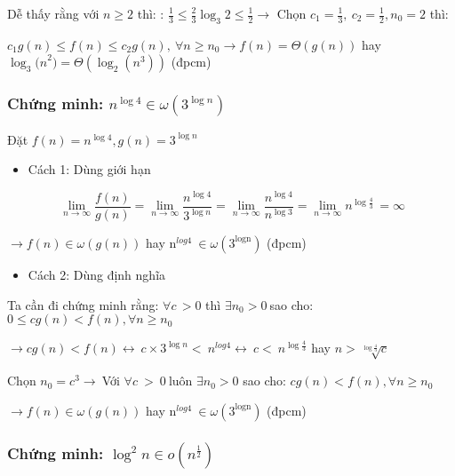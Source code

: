 Dễ thấy rằng với \(n \geq 2\) thì: :
\(\frac{1}{3} \leq \frac{2}{3}\log_{3}2 \leq \frac{1}{2} \rightarrow\)
Chọn \(c_{1} = \frac{1}{3},\ c_{2} = \frac{1}{2},n_{0} = 2\) thì:

\(c_{1}g(n) \leq f(n) \leq c_{2}g(n),\ \forall n \geq n_{0} \rightarrow f(n) = \Theta(g(n))\)
hay \(\log_{3}{{(n}^{2})} = \Theta(\log_{2}{(n^{3})})\) (đpcm)

\subsubsection{  \textbf{Chứng minh:}
  \(n^{\log 4} \in \omega\left(3^{\log n}\right)\)}

Đặt \(f(n) = n^{\log 4},g(n) = 3^{\log n}\)

\begin{itemize}
\item
  Cách 1: Dùng giới hạn
\end{itemize}

\[\ \lim_{n \rightarrow \infty}\frac{f(n)}{g(n)} = \lim_{n \rightarrow \infty}\frac{n^{\log 4}}{3^{\log n}} = \lim_{n \rightarrow \infty}\frac{n^{\log 4}}{n^{\log 3}} = \lim_{n \rightarrow \infty}n^{\log\frac{4}{3}}\, = \infty\]

\(\rightarrow f(n) \in \omega(g(n))\)
hay\(\text{\ n}^{log4}\  \in \omega\left( 3^{\text{logn}} \right)\)
(đpcm)

\begin{itemize}
\item
  Cách 2: Dùng định nghĩa
\end{itemize}

Ta cần đi chứng minh rằng: \(\forall c\, > 0\) thì
\(\exists n_{0} > 0\ \)sao cho:
\(0 \leq cg(n) < f(n),\forall n \geq n_{0}\)

\(\rightarrow cg(n) < f(n) \leftrightarrow \ c\times 3^{\log n} < \ n^{log4} \leftrightarrow \ c < \ n^{\log\frac{4}{3}}\)
hay \(n > \sqrt[{\log\frac{4}{3}}]{c}\)

Chọn \(n_{0} = c^{3} \rightarrow \ \)Với \(\forall c\  > \ 0\ \)luôn
\(\exists n_{0} > 0\) sao cho: \(cg(n) < f(n),\forall n \geq n_{0}\)

\(\rightarrow f(n) \in \omega(g(n))\)
hay\(\text{\ n}^{log4}\  \in \omega\left( 3^{\text{logn}} \right)\)
(đpcm)

\subsubsection{  \textbf{Chứng
  minh: }\(\log^2 n \in o\left(n^\frac{1}{2}\right)\)}

